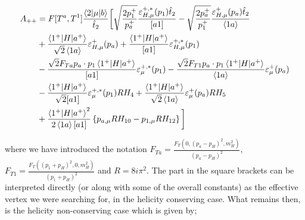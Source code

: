 \begin{equation}
\begin{split}
A_{++} &= F[T^a,T^1]\frac{\mathinner{\langle2\vert\mu\vert b\rangle}_{}}{\hat{t}_2} \bigg[\sqrt{\frac{2p_1^+}{p_a^+}}\frac{\varepsilon_{H,\mu}^{+,*}(p_1) \hat{t}_2}{[a1]} - \sqrt{\frac{2p_a^+}{p_1^+}}\frac{\varepsilon_{H,\mu}^{+}(p_a)\hat{t}_2}{ \left<1 a \right>} \\
&+ \frac{\mathinner{\langle1^+\vert H\vert a^+\rangle}_{}}{\sqrt{2}\left<1 a \right>}\varepsilon_{H,\mu}^+(p_a) + \frac{\mathinner{\langle1^+\vert H\vert a^+\rangle}_{}}{[a 1]}\varepsilon^{+,*}_{H,\mu}(p_1) \\
&- \frac{\sqrt{2} F_{Ta} p_a \cdot p_1 \mathinner{\langle1^+\vert H\vert a^+\rangle}_{}}{[a1]}\varepsilon^{+,*}_\mu (p_1) - \frac{\sqrt{2} F_{T1} p_a \cdot p_1 \mathinner{\langle1^+\vert H\vert a^+\rangle}_{}}{\left<1 a \right>}\varepsilon^+_\mu (p_a)  \\ 
& -\frac{\mathinner{\langle1^+\vert H\vert a^+\rangle}_{}}{\sqrt{2} [a1]} \varepsilon^{+,*}_\mu(p_1) R H_4 + \frac{\mathinner{\langle1^+\vert H\vert a^+\rangle}_{}}{\sqrt{2} \left <1 a \right>} \varepsilon^{+}_\mu(p_a)R H_5 \\
 & + \frac{\mathinner{\langle1^+\vert H\vert a^+\rangle}_{}^2}{2 \left<1 a \right> [a 1]}\left \{ p_{a,\mu} R H_{10} - p_{1,\mu}RH_{12}\right \} \bigg]
\end{split}
\end{equation}

where we have introduced the notation $F_{Ta} = \frac{F_T(0,(p_a-p_H)^2,m_H^2)}{(p_a-p_H)^2}$,  $F_{T1} = \frac{F_T((p_1+p_H)^2, 0, m_H^2)}{(p_1+p_H)^2}$ and $R = 8 i \pi^2$. The part in the square brackets can be interpreted directly (or along with some of the overall constants) as the effective vertex we were searching for, in the helicity conserving case. What remains then, is the helicity non-conserving case which is given by;

